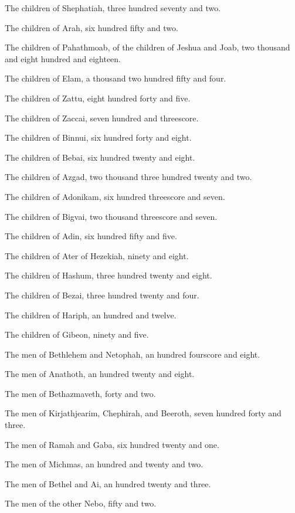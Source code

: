 \Verse The children of Shephatiah, three hundred seventy and two.

\Verse The children of Arah, six hundred fifty and two.

\Verse The children of Pahathmoab, of the children of Jeshua and Joab, two thousand and eight hundred and eighteen.

\Verse The children of Elam, a thousand two hundred fifty and four.

\Verse The children of Zattu, eight hundred forty and five.

\Verse The children of Zaccai, seven hundred and threescore.

\Verse The children of Binnui, six hundred forty and eight.

\Verse The children of Bebai, six hundred twenty and eight.

\Verse The children of Azgad, two thousand three hundred twenty and two.

\Verse The children of Adonikam, six hundred threescore and seven.

\Verse The children of Bigvai, two thousand threescore and seven.

\Verse The children of Adin, six hundred fifty and five.

\Verse The children of Ater of Hezekiah, ninety and eight.

\Verse The children of Hashum, three hundred twenty and eight.

\Verse The children of Bezai, three hundred twenty and four.

\Verse The children of Hariph, an hundred and twelve.

\Verse The children of Gibeon, ninety and five.

\Verse The men of Bethlehem and Netophah, an hundred fourscore and eight.

\Verse The men of Anathoth, an hundred twenty and eight.

\Verse The men of Bethazmaveth, forty and two.

\Verse The men of Kirjathjearim, Chephirah, and Beeroth, seven hundred forty and three.

\Verse The men of Ramah and Gaba, six hundred twenty and one.

\Verse The men of Michmas, an hundred and twenty and two.

\Verse The men of Bethel and Ai, an hundred twenty and three.

\Verse The men of the other Nebo, fifty and two.

